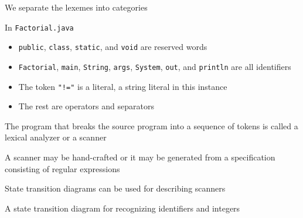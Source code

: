 \documentclass[8pt,a4paper,compress]{beamer}
\begin{document}
\begin{frame}[fragile]
\pause

We separate the lexemes into categories

\pause\bigskip

In \lstinline{Factorial.java}
\begin{itemize}
\pause
\item \lstinline{public}, \lstinline{class}, \lstinline{static}, and \lstinline{void} are reserved words

\pause
\item \lstinline{Factorial}, \lstinline{main}, \lstinline{String}, \lstinline{args}, \lstinline{System}, \lstinline{out}, and \lstinline{println} are all identifiers

\pause
\item The token \lstinline{"!="} is a literal, a string literal in this instance

\pause
\item The rest are operators and separators
\end{itemize}

\pause\bigskip

The program that breaks the source program into a sequence of tokens is called a lexical analyzer or a scanner

\pause\bigskip

A scanner may be hand-crafted or it may be generated from a specification consisting of regular expressions
\end{frame}

\begin{frame}[fragile]
\pause

State transition diagrams can be used for describing scanners

\pause\bigskip

A state transition diagram for recognizing identifiers and integers

\begin{center}
\end{center}
\end{frame}
\end{document}
